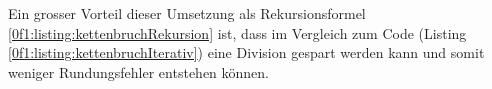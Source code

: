 Ein grosser Vorteil dieser Umsetzung als Rekursionsformel \eqref{0f1:listing:kettenbruchRekursion} ist, dass im Vergleich zum Code (Listing \ref{0f1:listing:kettenbruchIterativ}) eine Division gespart werden kann und somit weniger Rundungsfehler entstehen können.

